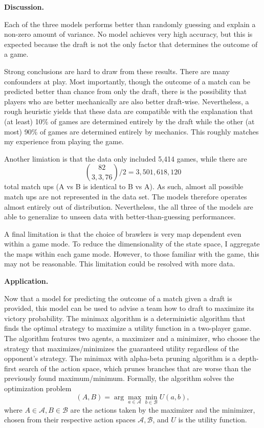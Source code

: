 \documentclass[12pt]{article}
\begin{document}
\textbf{Discussion.}

Each of the three models performs better than randomly guessing and explain a non-zero amount of variance. No model achieves very high accuracy, but this is expected because the draft is not the only factor that determines the outcome of a game.

Strong conclusions are hard to draw from these results. There are many confounders at play. Most importantly, though the outcome of a match can be predicted better than chance from only the draft, there is the possibility that players who are better mechanically are also better draft-wise. Nevertheless, a rough heuristic yields that these data are compatible with the explanation that (at least) 10\% of games are determined entirely by the draft while the other (at most) 90\% of games are determined entirely by mechanics. This roughly matches my experience from playing the game.

Another limiation is that the data only included 5,414 games, while there are 
$$\binom{82}{3,3,76} \big/ 2 = 3,501,618,120$$
total match ups (A vs B is identical to B vs A). As such, almost all possible match ups are not represented in the data set. The models therefore operates almost entirely out of distribution. Nevertheless, the all three of the models are able to generalize to unseen data with better-than-guessing performances.

A final limitation is that the choice of brawlers is very map dependent even within a game mode. To reduce the dimensionality of the state space, I aggregate the maps within each game mode. However, to those familiar with the game, this may not be reasonable. This limitation could be resolved with more data.

\textbf{Application.} 

Now that a model for predicting the outcome of a match given a draft is provided, this model can be used to advise a team how to draft to maximize its victory probability. The minimax algorithm is a deterministic algorithm that finds the optimal strategy to maximize a utility function in a two-player game. The algorithm features two agents, a maximizer and a minimizer, who choose the strategy that maximizes/minimizes the guaranteed utility regardless of the opponent's strategy. The minimax with alpha-beta pruning algorithm is a depth-first search of the action space, which prunes branches that are worse than the previously found maximum/minimum. Formally, the algorithm solves the optimization problem 
$$(A, B) = \arg\max_{a \in \mathcal{A}} \min_{b \in \mathcal{B}} U(a, b),$$
where $A \in \mathcal{A}, B \in \mathcal{B}$ are the actions taken by the maximizer and the minimizer, chosen from their respective action spaces $\mathcal{A}, \mathcal{B}$, and $U$ is the utility function.
\end{document}
